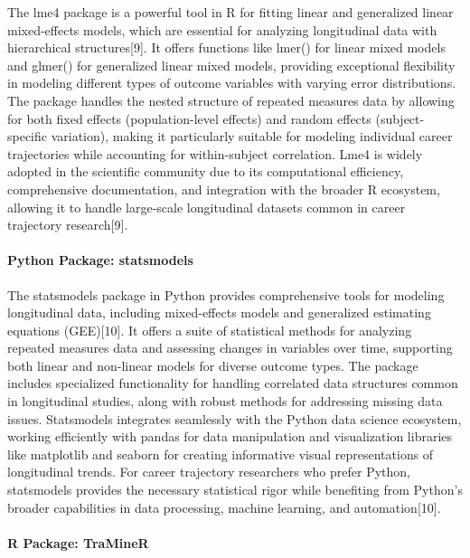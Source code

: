 \documentclass[./main.tex]{subfiles}
\begin{document}
The lme4 package is a powerful tool in R for fitting linear and
generalized linear mixed-effects models, which are essential for
analyzing longitudinal data with hierarchical structures{[}9{]}. It
offers functions like lmer() for linear mixed models and glmer() for
generalized linear mixed models, providing exceptional flexibility in
modeling different types of outcome variables with varying error
distributions. The package handles the nested structure of repeated
measures data by allowing for both fixed effects (population-level
effects) and random effects (subject-specific variation), making it
particularly suitable for modeling individual career trajectories while
accounting for within-subject correlation. Lme4 is widely adopted in the
scientific community due to its computational efficiency, comprehensive
documentation, and integration with the broader R ecosystem, allowing it
to handle large-scale longitudinal datasets common in career trajectory
research{[}9{]}.

\paragraph{Python Package:
statsmodels}\label{python-package-statsmodels}

The statsmodels package in Python provides comprehensive tools for
modeling longitudinal data, including mixed-effects models and
generalized estimating equations (GEE){[}10{]}. It offers a suite of
statistical methods for analyzing repeated measures data and assessing
changes in variables over time, supporting both linear and non-linear
models for diverse outcome types. The package includes specialized
functionality for handling correlated data structures common in
longitudinal studies, along with robust methods for addressing missing
data issues. Statsmodels integrates seamlessly with the Python data
science ecosystem, working efficiently with pandas for data manipulation
and visualization libraries like matplotlib and seaborn for creating
informative visual representations of longitudinal trends. For career
trajectory researchers who prefer Python, statsmodels provides the
necessary statistical rigor while benefiting from Python's broader
capabilities in data processing, machine learning, and
automation{[}10{]}.

\paragraph{R Package: TraMineR}\label{r-package-traminer}
\end{document}
